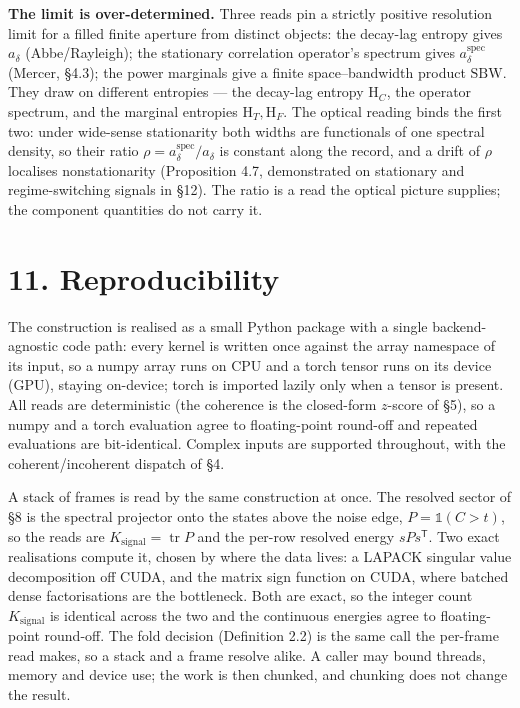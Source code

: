 \documentclass[10pt,letterpaper,twocolumn]{article}
\begin{document}
\textbf{The limit is over-determined.} Three reads pin a strictly positive resolution limit for a filled finite aperture from distinct objects: the decay-lag entropy gives \(a_\delta\) (Abbe/Rayleigh); the stationary correlation operator's spectrum gives \(a_\delta^{\mathrm{spec}}\) (Mercer, §4.3); the power marginals give a finite space--bandwidth product \(\mathrm{SBW}\). They draw on different entropies --- the decay-lag entropy \(\mathrm H_C\), the operator spectrum, and the marginal entropies \(\mathrm H_T,\mathrm H_F\). The optical reading binds the first two: under wide-sense stationarity both widths are functionals of one spectral density, so their ratio \(\rho=a_\delta^{\mathrm{spec}}/a_\delta\) is constant along the record, and a drift of \(\rho\) localises nonstationarity (Proposition 4.7, demonstrated on stationary and regime-switching signals in §12). The ratio is a read the optical picture supplies; the component quantities do not carry it.

\section{11. Reproducibility}\label{11-reproducibility}

The construction is realised as a small Python package with a single backend-agnostic code path: every kernel is written once against the array namespace of its input, so a numpy array runs on CPU and a torch tensor runs on its device (GPU), staying on-device; torch is imported lazily only when a tensor is present. All reads are deterministic (the coherence is the closed-form \(z\)-score of §5), so a numpy and a torch evaluation agree to floating-point round-off and repeated evaluations are bit-identical. Complex inputs are supported throughout, with the coherent/incoherent dispatch of §4.

A stack of frames is read by the same construction at once. The resolved sector of §8 is the spectral projector onto the states above the noise edge, \(P=\mathbb 1(C>t)\), so the reads are \(K_{\mathrm{signal}}=\operatorname{tr}P\) and the per-row resolved energy \(sPs^{\mathsf T}\). Two exact realisations compute it, chosen by where the data lives: a LAPACK singular value decomposition off CUDA, and the matrix sign function on CUDA, where batched dense factorisations are the bottleneck. Both are exact, so the integer count \(K_{\mathrm{signal}}\) is identical across the two and the continuous energies agree to floating-point round-off. The fold decision (Definition 2.2) is the same call the per-frame read makes, so a stack and a frame resolve alike. A caller may bound threads, memory and device use; the work is then chunked, and chunking does not change the result.
\end{document}

